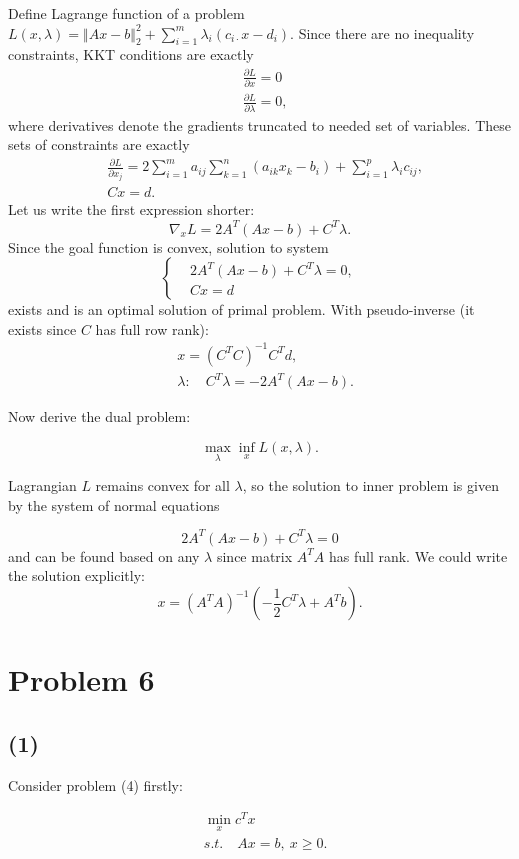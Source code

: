 \documentclass[a4paper,12pt,russian]{extreport}
\begin{document}
Define Lagrange function of a problem $L(x,\lambda)=\Vert Ax-b\Vert_2^2+\sum_{i=1}^m\lambda_i(c_{i\cdot}x-d_i)$. Since there are no inequality constraints, KKT conditions are exactly
\begin{align*}
&\frac{\partial L}{\partial x} =0\\
&\frac{\partial L}{\partial \lambda} =0,
\end{align*}
where derivatives denote the gradients truncated to needed set of variables. These sets of constraints are exactly
\begin{align*}
&\frac{\partial L}{\partial x_j} = 2\sum_{i=1}^m a_{ij}\sum_{k=1}^n(a_{ik}x_k - b_i)+ \sum_{i=1}^p\lambda_i c_{ij}, \\
&Cx=d.
\end{align*}
Let us write the first expression shorter:
$$
\nabla_{x}L = 2A^T(Ax-b) +  C^T\lambda.
$$
Since the goal function is convex, solution to system
$$
\begin{cases}
&2A^T(Ax-b)+C^T\lambda=0,\\
&Cx=d
\end{cases}
$$
exists and is an optimal solution of primal problem. With pseudo-inverse (it exists since $C$ has full row rank):
\begin{align*}
& x=(C^TC)^{-1}C^Td,\\
& \lambda: \quad C^T\lambda = -2A^T(Ax-b).
\end{align*}

Now derive the dual problem:

$$
\max_{\lambda} \inf_{x} L(x,\lambda).
$$

Lagrangian $L$ remains convex for all $\lambda$, so the solution to inner problem is given by the system of normal equations

$$
2A^T(Ax-b)+C^T\lambda=0
$$
and can be found based on any $\lambda$ since matrix $A^TA$ has full rank. We could write the solution explicitly:
$$
x=(A^TA)^{-1}\left(-\frac{1}{2}C^T\lambda+A^Tb\right).
$$

\section*{Problem 6}

\subsection*{(1)}
Consider problem (4) firstly:

\begin{align*}
&\min_x c^Tx\\
&s.t.\quad Ax=b, ~x \geq 0.
\end{align*}
\end{document}
